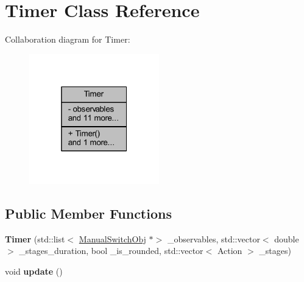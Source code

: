 \hypertarget{class_timer}{}\section{Timer Class Reference}
\label{class_timer}


Collaboration diagram for Timer\+:\nopagebreak
\begin{figure}[H]
\begin{center}
\leavevmode
\includegraphics[width=160pt]{class_timer__coll__graph}
\end{center}
\end{figure}
\subsection*{Public Member Functions}
\begin{DoxyCompactItemize}
\item 
\mbox{\label{class_timer_a0b2aa28140cd3a79edb0fbdafcbb9ee0}} 
{\bfseries Timer} (std\+::list$<$ \hyperlink{class_manual_switch_obj}{Manual\+Switch\+Obj} $\ast$$>$ \+\_\+observables, std\+::vector$<$ double $>$ \+\_\+stages\+\_\+duration, bool \+\_\+is\+\_\+rounded, std\+::vector$<$ Action $>$ \+\_\+stages)
\item 
\mbox{\label{class_timer_a745ad59b5a46744cd871a1129a25d74f}} 
void {\bfseries update} ()
\end{DoxyCompactItemize}
